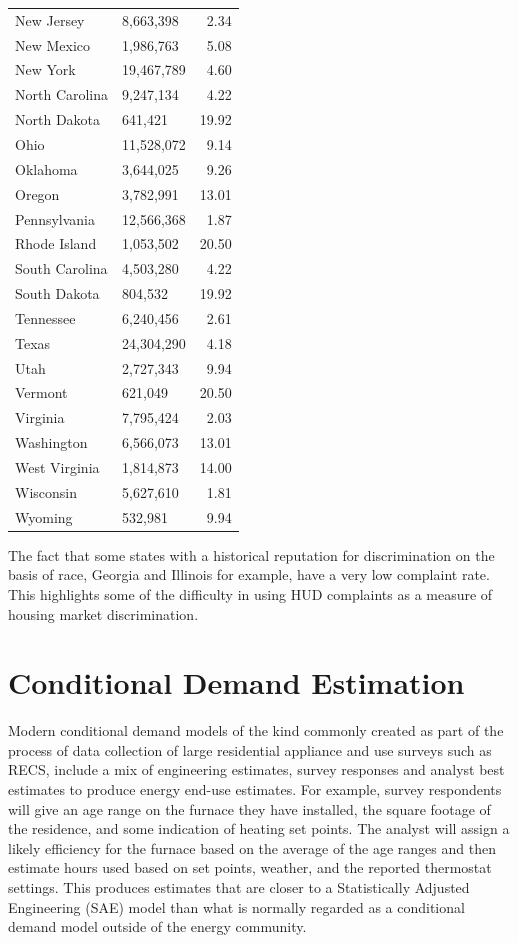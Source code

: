 \documentclass{article}
\begin{document}
\begin{table}[htbp]
{\begin{tabular}{llr}
  New Jersey & 8,663,398 & 2.34 \\ 
  New Mexico & 1,986,763 & 5.08 \\ 
  New York & 19,467,789 & 4.60 \\ 
  North Carolina & 9,247,134 & 4.22 \\ 
  North Dakota & 641,421 & 19.92 \\ 
  Ohio & 11,528,072 & 9.14 \\ 
  Oklahoma & 3,644,025 & 9.26 \\ 
  Oregon & 3,782,991 & 13.01 \\ 
  Pennsylvania & 12,566,368 & 1.87 \\ 
  Rhode Island & 1,053,502 & 20.50 \\ 
  South Carolina & 4,503,280 & 4.22 \\ 
  South Dakota & 804,532 & 19.92 \\ 
  Tennessee & 6,240,456 & 2.61 \\ 
  Texas & 24,304,290 & 4.18 \\ 
  Utah & 2,727,343 & 9.94 \\ 
  Vermont & 621,049 & 20.50 \\ 
  Virginia & 7,795,424 & 2.03 \\ 
  Washington & 6,566,073 & 13.01 \\ 
  West Virginia & 1,814,873 & 14.00 \\ 
  Wisconsin & 5,627,610 & 1.81 \\ 
  Wyoming & 532,981 & 9.94 \\ 
   \hline
\end{tabular}
}
\end{table}
The fact that some states with a historical reputation for discrimination on the basis of race, Georgia and Illinois for example, have a very low complaint rate.  This highlights some of the difficulty in using HUD complaints as a measure of housing market discrimination.

\section{Conditional Demand Estimation}
  
Modern conditional demand models of the kind commonly created as part of the process of data collection of large residential appliance and use surveys such as RECS, include a mix of engineering estimates, survey responses and analyst best estimates to produce energy end-use estimates.  For example, survey respondents will give an age range on the furnace they have installed, the square footage of the residence, and some indication of heating set points.  The analyst will assign a likely efficiency for the furnace based on the average of the age ranges and then estimate hours used based on set points, weather, and the reported thermostat settings.  This produces estimates that are closer to a Statistically Adjusted Engineering (SAE) model than what is normally regarded as a conditional demand model outside of the energy community.
\end{document}
